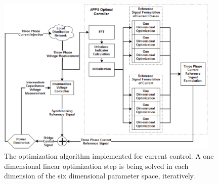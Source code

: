 
        \begin{figure}[h]
        \centering
        \includegraphics[width=0.95\textwidth]{Unblance_EPS_Pics/APPS_1_2_.eps}
        \caption{The optimization algorithm implemented for current control. A one dimensional linear optimization step is being solved in each dimension of the six dimensional parameter space, iteratively.}
        \label{fig:APPS}
        \end{figure}

